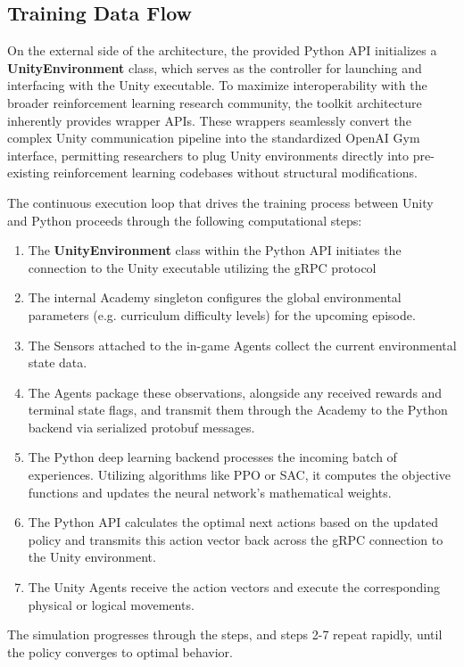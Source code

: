 \subsection{Training Data Flow}
On the external side of the architecture, the provided Python API initializes a \textbf{UnityEnvironment} class, which serves as the controller for launching and interfacing with the Unity executable. To maximize interoperability with the broader reinforcement learning research community, the toolkit architecture inherently provides wrapper APIs. These wrappers seamlessly convert the complex Unity communication pipeline into the standardized OpenAI Gym interface, permitting researchers to plug Unity environments directly into pre-existing reinforcement learning codebases without structural modifications.

The continuous execution loop that drives the training process between Unity and Python proceeds through the following computational steps:
\begin{enumerate}
	\item The \textbf{UnityEnvironment} class within the Python API initiates the connection to the Unity executable utilizing the gRPC protocol
	\item The internal Academy singleton configures the global environmental parameters (e.g. curriculum difficulty levels) for the upcoming episode.
	\item The Sensors attached to the in-game Agents collect the current environmental state data.
	\item The Agents package these observations, alongside any received rewards and terminal state flags, and transmit them through the Academy to the Python backend via serialized protobuf messages.
	\item The Python deep learning backend processes the incoming batch of experiences. Utilizing algorithms like PPO or SAC, it computes the objective functions and updates the neural network's mathematical weights.
	\item The Python API calculates the optimal next actions based on the updated policy and transmits this action vector back across the gRPC connection to the Unity environment.
	\item The Unity Agents receive the action vectors and execute the corresponding physical or logical movements. 
\end{enumerate}
The simulation progresses through the steps, and steps 2-7 repeat rapidly, until the policy converges to optimal behavior.

